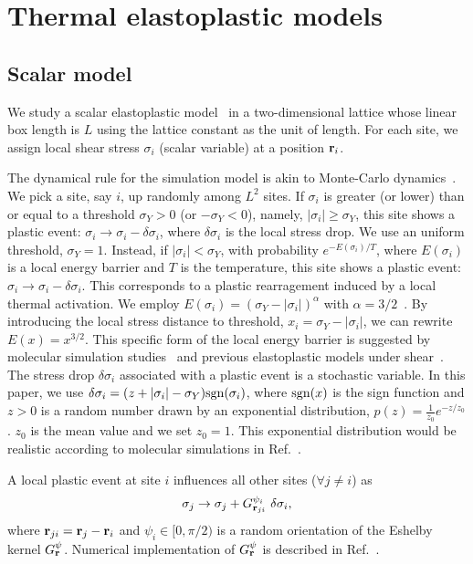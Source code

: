 \documentclass[pre,twocolumn,superscriptaddress,tightenlines,showpacs,longbibliography,floatfix,footinbib]{revtex4-1}
\begin{document}
\section{Thermal elastoplastic models}
\label{sec:appendix_models}

\subsection{Scalar model}

We study a scalar elastoplastic model~\cite{ozawa2023elasticity} in a two-dimensional lattice whose linear box length is $L$ using the lattice constant as the unit of length. For each site, we assign local shear stress $\sigma_i$ (scalar variable) at a position ${\bf r}_i$.

The dynamical rule for the simulation model is akin to Monte-Carlo dynamics~\cite{berthier2007monte}. 
We pick a site, say $i$, up randomly among $L^2$ sites. 
If $\sigma_i$ is greater (or lower) than or equal to a threshold $\sigma_Y>0$ (or $-\sigma_Y<0$), namely,
$|\sigma_i| \geq \sigma_Y$, this site shows a plastic event: $\sigma_i \to \sigma_i - \delta \sigma_i$, where $\delta \sigma_i$ is the local stress drop.
We use an uniform threshold, $\sigma_Y=1$.
Instead, if $|\sigma_i| < \sigma_Y$, with probability $e^{-E(\sigma_i)/T}$, where $ E(\sigma_i)$ is a local energy barrier and $T$ is the temperature, this site shows a plastic event: $\sigma_i \to \sigma_i - \delta \sigma_i$. This corresponds to a plastic rearragement induced by a local thermal activation. We employ $E(\sigma_i)=(\sigma_Y-|\sigma_i|)^\alpha$ with $\alpha=3/2$~\cite{maloney2006energy}.
By introducing the local stress distance to threshold, $x_i=\sigma_Y-|\sigma_i|$, we can rewrite $E(x)=x^{3/2}$.
This specific form of the local energy barrier is suggested by molecular simulation studies~\cite{fan2014thermally,lerbinger2022relevance} and previous elastoplastic models under shear~\cite{popovic2021thermally,ferrero2021yielding}.
The stress drop $\delta \sigma_i$ associated with a plastic event is a stochastic variable. In this paper, we use $\delta \sigma_i=(z+|\sigma_i|-\sigma_Y){\rm sgn}(\sigma_i)$, where ${\rm sgn}(x)$ is the sign function and $z >0$ is a random number drawn by an exponential distribution, $p(z)=\frac{1}{z_0} e^{-z/z_0}$. $z_0$ is the mean value and we set $z_0=1$. This exponential distribution would be realistic according to molecular simulations in Ref.~\cite{barbot2018local}.

A local plastic event at site $i$ influences all other sites ($\forall j \neq i$) as 
\begin{equation}
    \sigma_j \to \sigma_j + {G}^{\psi_i}_{{\bf r}_{ji}} \ \delta \sigma_i,
\end{equation}
where ${\bf r}_{ji}={\bf r}_{j}-{\bf r}_{i}$ and $\psi_i \in [0, \pi/2)$ is a random orientation of the Eshelby kernel ${G}^{\psi}_{\bf r}$. Numerical implementation of ${G}^{\psi}_{\bf r}$ is described in Ref.~\cite{ozawa2023elasticity}.
\end{document}
